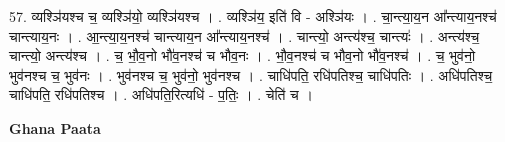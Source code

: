 \documentclass[17pt]{extarticle}
\begin{document}
57. व्यश्ञि॑यश्च च॒ व्यश्ञि॑यो॒ व्यश्ञि॑यश्च । . व्यश्ञि॑य॒ इति॑ वि - अश्ञि॑यः । . चा॒न्त्या॒य॒न आ᳚न्त्याय॒नश्च॑ चान्त्याय॒नः । . आ॒न्त्या॒य॒नश्च॑ चान्त्याय॒न आ᳚न्त्याय॒नश्च॑ । . चान्त्यो॒ अन्त्य॑श्च॒ चान्त्यः॑ । . अन्त्य॑श्च॒ चान्त्यो॒ अन्त्य॑श्च । . च॒ भौ॒व॒नो भौ॑व॒नश्च॑ च भौव॒नः । . भौ॒व॒नश्च॑ च भौव॒नो भौ॑व॒नश्च॑ । . च॒ भुव॑नो॒ भुव॑नश्च च॒ भुव॑नः । . भुव॑नश्च च॒ भुव॑नो॒ भुव॑नश्च । . चाधि॑पति॒ रधि॑पतिश्च॒ चाधि॑पतिः । . अधि॑पतिश्च॒ चाधि॑पति॒ रधि॑पतिश्च । . अधि॑पति॒रित्यधि॑ - प॒तिः॒ । . चेति॑ च । \newline

\textbf{Ghana Paata } \newline
\end{document}
